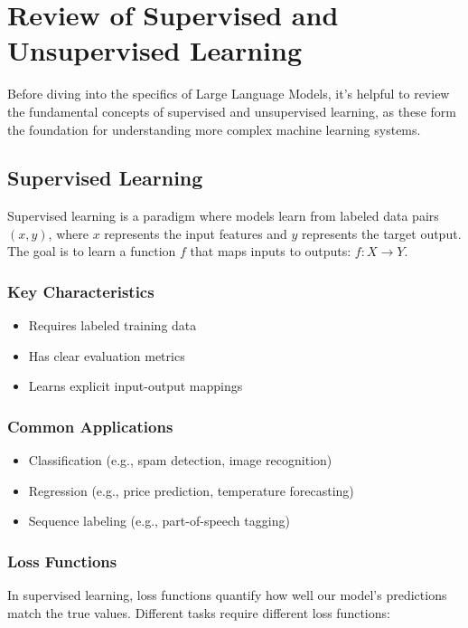 \section{Review of Supervised and Unsupervised Learning}
\label{sec:review_of_supervised_and_unsupervised_learning}

Before diving into the specifics of Large Language Models, it's helpful to review the fundamental concepts of supervised and unsupervised learning, as these form the foundation for understanding more complex machine learning systems.

\subsection{Supervised Learning}

Supervised learning is a paradigm where models learn from labeled data pairs $(x, y)$, where $x$ represents the input features and $y$ represents the target output. The goal is to learn a function $f$ that maps inputs to outputs: $f: X \rightarrow Y$.

\subsubsection{Key Characteristics}
\begin{itemize}[noitemsep]
    \item Requires labeled training data
    \item Has clear evaluation metrics
    \item Learns explicit input-output mappings
\end{itemize}

\subsubsection{Common Applications}
\begin{itemize}[noitemsep]
    \item Classification (e.g., spam detection, image recognition)
    \item Regression (e.g., price prediction, temperature forecasting)
    \item Sequence labeling (e.g., part-of-speech tagging)
\end{itemize}

\subsubsection{Loss Functions}
In supervised learning, loss functions quantify how well our model's predictions match the true values. Different tasks require different loss functions:

